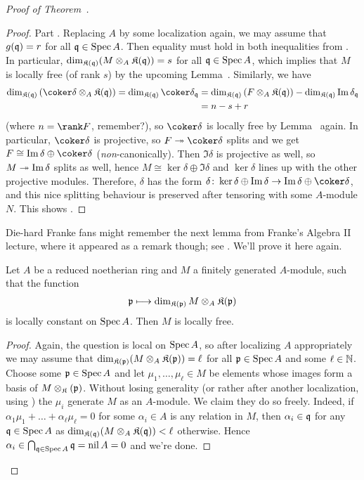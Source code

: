 \documentclass[a4paper,parskip=half,numbers=enddot, DIV=12]{scrreprt}
\begin{document}
\begin{proof}[Proof of Theorem~]
\begin{proof}
		Part . Replacing $A$ by some localization again, we may assume that $g(\mathfrak{q})=r$ for all $\mathfrak{q}\in\operatorname{Spec} A$. Then equality must hold in both inequalities from . In particular, $\dim_{\mathfrak{K}(\mathfrak{q})}(M\otimes_A\mathfrak{K}(\mathfrak{q}))=s$ for all $\mathfrak{q}\in\operatorname{Spec} A$, which implies that $M$ is locally free (of rank $s$) by the upcoming Lemma~. Similarly, we have
		\begin{align*}
			\dim_{\KK(\qq)}\left(\coker\delta\otimes_A\KK(\qq)\right)=\dim_{\KK(\qq)}\coker\delta_\qq&=\dim_{\KK(\qq)}\left(F\otimes_A\KK(\qq)\right)-\dim_{\KK(\qq)}\Im\delta_\qq\\
			&=n-s+r
		\end{align*}
		(where $n=\rank F$, remember?), so $\coker\delta$ is locally free by Lemma~ again. In particular, $\coker\delta$ is projective, so $F\epimorphism\coker\delta$ splits and we get $F\cong \Im\delta\oplus\coker\delta$ (\emph{non}-canonically). Then $\Im\delta$ is projective as well, so $M\epimorphism\Im\delta$ splits as well, hence $M\cong \ker\delta\oplus\Im\delta$ and $\ker\delta$ lines up with the other projective modules. Therefore, $\delta$ has the form $\delta\colon \ker\delta\oplus\Im\delta\morphism\Im\delta\oplus\coker\delta$, and this nice splitting behaviour is preserved after tensoring with some $A$-module $N$. This shows .
	\end{proof}
	Die-hard Franke fans might remember the next lemma from Franke's Algebra II lecture, where it appeared as a remark though; see \cite[25]{alg2}. We'll prove it here again.
	\begin{lem}
		Let $A$ be a reduced noetherian ring and $M$ a finitely generated $A$-module, such that the function
		\begin{align*}
			\mathfrak{p}\longmapsto \dim_{\mathfrak{K}(\mathfrak{p})}M\otimes_A\mathfrak{K}(\mathfrak{p})
		\end{align*}
		is locally constant on $\operatorname{Spec} A$. Then $M$ is locally free.
	\end{lem}
	\begin{proof}
		Again, the question is local on $\operatorname{Spec} A$, so after localizing $A$ appropriately we may assume that $\dim_{\mathfrak{K}(\mathfrak{p})}(M\otimes_A\mathfrak{K}(\mathfrak{p}))=\ell$ for all $\mathfrak{p}\in\operatorname{Spec} A$ and some $\ell\in\mathbb{N}$. Choose some $\mathfrak{p}\in\operatorname{Spec} A$ and let $\mu_1,\ldots,\mu_\ell\in M$ be elements whose images form a basis of $M\otimes_{\mathfrak{K}}(\mathfrak{p})$. Without losing generality (or rather after another localization, using \cite[Lemma~1.5.1]{alg2}) the $\mu_i$ generate $M$ as an $A$-module. We claim they do so freely. Indeed, if $\alpha_1\mu_1+\ldots+\alpha_\ell\mu_\ell=0$ for some $\alpha_i\in A$ is any relation in $M$, then $\alpha_i\in\mathfrak{q}$ for any $\mathfrak{q}\in\operatorname{Spec} A$ as $\dim_{\mathfrak{K}(\mathfrak{q})}(M\otimes_A\mathfrak{K}(\mathfrak{q}))<\ell$ otherwise. Hence $\alpha_i\in\bigcap_{\mathfrak{q}\in\operatorname{Spec} A}\mathfrak{q}=\operatorname{nil} A=0$ and we're done.

\end{proof}
\end{proof}
\end{document}
